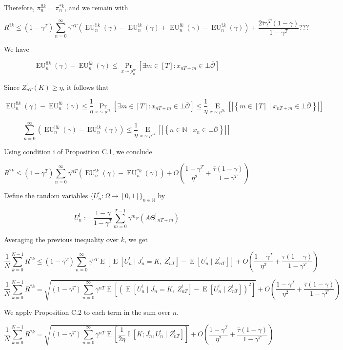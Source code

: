 \documentclass[a4paper]{article}
\newcommand{\AP}[1]{\left(#1\right)}
\newcommand{\AB}[1]{\left[#1\right]}
\newcommand{\AC}[1]{\left\{#1\right\}}
\newcommand{\E}[1]{\underset{#1}{\operatorname{E}}}
\newcommand{\Ea}[2]{\underset{#1}{\operatorname{E}}\AB{#2}}
\newcommand{\I}[1]{\underset{#1}{\operatorname{I}}}
\newcommand{\Nats}{\mathbb{N}}
\newcommand{\Sq}[2]{\{#1\}_{#2 \in \Nats}}
\newcommand{\Sqn}[1]{\Sq{#1}{n}}
\newcommand{\Abs}[1]{\left\vert #1 \right\vert}
\newcommand{\Ob}{\mathcal{O}}
\newcommand{\Ado}{\bar{\Ob}}
\newcommand{\EU}{\operatorname{EU}}
\newcommand{\Z}{Z}
\newcommand{\J}{J}
\begin{document}
Therefore, $\pi^{!!k}_n = \pi^{*k}_n$, and we remain with

$$R^{?k} \leq (1-\gamma^T)\sum_{n=0}^\infty \gamma^{nT} \left(\EU^{!!k}_n(\gamma)-\EU^{!k}_n(\gamma)+\EU^{!k}_n(\gamma)-\EU^{?k}_n(\gamma)\right) + \frac{2\bar{\tau}\gamma^T(1-\gamma)}{1-\gamma^T}???$$

We have

$$\EU^{!!k}_n(\gamma)-\EU^{!k}_n(\gamma) \leq \Pr_{x\sim\rho^{!k}_n}\left[\exists m \in [T]: x_{nT+m} \in \bot\Ado\right]$$

Since $\Z_{nT}^{!}(K) \geq \eta$, it follows that

$$\EU^{!!k}_n(\gamma)-\EU^{!k}_n(\gamma) \leq \frac{1}{\eta}\Pr_{x\sim\rho^{?k}}\left[\exists m \in [T]: x_{nT+m} \in \bot\Ado\right] \leq \frac{1}{\eta}\Ea{x\sim\rho^{?k}}{\Abs{\AC{m \in [T] \mid x_{nT+m} \in \bot\Ado}}}$$

$$\sum_{n=0}^\infty \AP{\EU^{!!k}_n(\gamma)-\EU^{!k}_n(\gamma)} \leq \frac{1}{\eta}\Ea{x\sim\rho^{?k}}{\Abs{\AC{n \in \Nats \mid x_n \in \bot\Ado}}}$$

Using condition i of Proposition C.1, we conclude

$$R^{?k} \leq (1-\gamma^T)\sum_{n=0}^\infty \gamma^{nT} \left(\EU^{!k}_n(\gamma)-\EU^{?k}_n(\gamma)\right) + O\left(\frac{1-\gamma^T}{\eta^2}+\frac{\bar{\tau}(1-\gamma)}{1-\gamma^T}\right)$$

Define the random variables $\Sqn{U^!_n : \Omega \rightarrow [0,1]}$ by 

$$U^!_n:=\frac{1-\gamma}{1-\gamma^T}\sum_{m=0}^{T-1} \gamma^{m} r\left(A\Theta^!_{:nT+m}\right)$$

Averaging the previous inequality over $k$, we get

$$\frac{1}{N}\sum_{k=0}^{N-1}R^{?k} \leq (1-\gamma^T)\sum_{n=0}^\infty \gamma^{nT} \E{}\left[\E{}\left[U^!_n \mid \J^!_n = K,\ Z^!_{nT}\right]-\E{}\left[U^!_n \mid Z^!_{nT}\right]\right] + O\left(\frac{1-\gamma^T}{\eta^2}+\frac{\bar{\tau}(1-\gamma)}{1-\gamma^T}\right)$$

$$\frac{1}{N}\sum_{k=0}^{N-1}R^{?k} = \sqrt{(1-\gamma^T)\sum_{n=0}^\infty \gamma^{nT} \E{}\left[\left(\E{}\left[U^!_n \mid \J^!_n = K,\ Z^!_{nT}\right]-\E{}\left[U^!_n \mid Z^!_{nT}\right]\right)^2\right]} + O\left(\frac{1-\gamma^T}{\eta^2}+\frac{\bar{\tau}(1-\gamma)}{1-\gamma^T}\right)$$

We apply Proposition C.2 to each term in the sum over $n$.

$$\frac{1}{N}\sum_{k=0}^{N-1}R^{?k} = \sqrt{(1-\gamma^T)\sum_{n=0}^\infty \gamma^{nT} \E{}\left[\frac{1}{2\eta}\I{}\left[K;\J^!_n,U^!_n \mid Z^!_{nT}\right]\right]} + O\left(\frac{1-\gamma^T}{\eta^2}+\frac{\bar{\tau}(1-\gamma)}{1-\gamma^T}\right)$$
\end{document}
